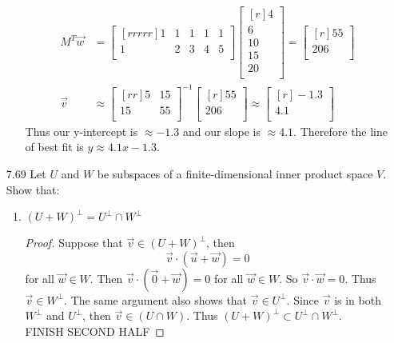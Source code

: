 \documentclass[12pt]{article}
\theoremstyle{definition}
\theoremstyle{plain}
\begin{document}
\begin{enumerate}
\begin{enumerate}
\begin{align*}
		M^T\vec{w}&=\begin{bmatrix}[rrrrr]1&1&1&1&1\\1&2&3&4&5\\\end{bmatrix}\begin{bmatrix}[r]4\\6\\10\\15\\20\\\end{bmatrix} = \begin{bmatrix}[r]55\\206\\\end{bmatrix}\\
		\vec{v}&\approx \begin{bmatrix}[rr]5&15\\15&55\\\end{bmatrix}^{-1}\begin{bmatrix}[r]55\\206\\\end{bmatrix} \approx \begin{bmatrix}[r]-1.3\\4.1\\\end{bmatrix}
		\end{align*}
		Thus our y-intercept is $\approx -1.3$ and our slope is $\approx 4.1$. Therefore the line of best fit is $y \approx 4.1x-1.3$.
	\end{enumerate}

\item[7.69]Let $U$ and $W$ be subspaces of a finite-dimensional inner product space $V$. Show that:
	\begin{enumerate}
	\item $(U+W)^\perp = U^\perp \cap W^\perp$
	\begin{proof}
	Suppose that $\vec{v}\in(U+W)^\perp$, then
	\[ \vec{v}\cdot (\vec{u}+\vec{w})=0\]
	for all $\vec{w}\in W$. Then $\vec{v}\cdot (\vec{0}+\vec{w})=0$ for all $\vec{w}\in W$. So $\vec{v}\cdot \vec{w} = 0$. Thus $\vec{v}\in W^\perp$. The same argument also shows that $\vec{v}\in U^\perp$. Since $\vec{v}$ is in both $W^\perp$ and $U^\perp$, then $\vec{v}\in (U \cap W)$. Thus $(U+W)^\perp \subset U^\perp \cap W^\perp$.\\
	FINISH SECOND HALF
	\end{proof}
	\end{enumerate}


\end{enumerate}
\end{document}
